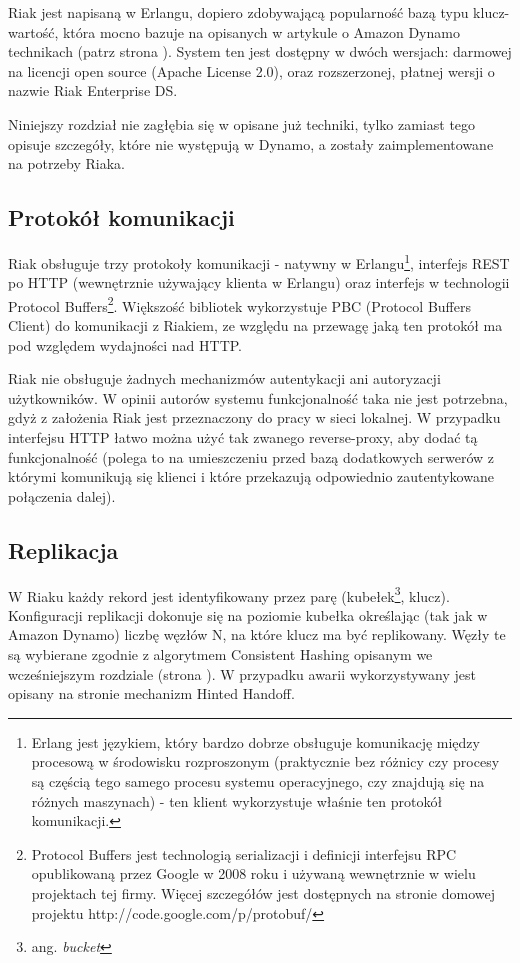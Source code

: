 Riak jest napisaną w Erlangu, dopiero zdobywającą popularność bazą typu klucz-wartość, która mocno bazuje na opisanych w artykule o Amazon Dynamo technikach (patrz strona \pageref{sec:dynamo-techniki}).
System ten jest dostępny w dwóch wersjach: darmowej na licencji open source (Apache License 2.0), oraz rozszerzonej, płatnej wersji o nazwie Riak Enterprise DS.

Niniejszy rozdział nie zagłębia się w opisane już techniki, tylko zamiast tego opisuje szczegóły, które nie występują w Dynamo, a zostały zaimplementowane na potrzeby Riaka.

\subsection*{Protokół komunikacji}

Riak obsługuje trzy protokoły komunikacji - natywny w Erlangu\footnote{Erlang jest językiem, który bardzo dobrze obsługuje komunikację między procesową w środowisku rozproszonym (praktycznie bez różnicy czy procesy są częścią tego samego procesu systemu operacyjnego, czy znajdują się na różnych maszynach) - ten klient wykorzystuje właśnie ten protokół komunikacji.}, interfejs REST po HTTP (wewnętrznie używający klienta w Erlangu) oraz interfejs w technologii Protocol Buffers\footnote{Protocol Buffers jest technologią serializacji i definicji interfejsu RPC opublikowaną przez Google w 2008 roku i używaną wewnętrznie w wielu projektach tej firmy. Więcej szczegółów jest dostępnych na stronie domowej projektu http://code.google.com/p/protobuf/}.
Większość bibliotek wykorzystuje PBC (Protocol Buffers Client) do komunikacji z Riakiem, ze względu na przewagę jaką ten protokół ma pod względem wydajności nad HTTP.

Riak nie obsługuje żadnych mechanizmów autentykacji ani autoryzacji użytkowników.
W opinii autorów systemu funkcjonalność taka nie jest potrzebna, gdyż z założenia Riak jest przeznaczony do pracy w sieci lokalnej.
W przypadku interfejsu HTTP łatwo można użyć tak zwanego reverse-proxy, aby dodać tą funkcjonalność (polega to na umieszczeniu przed bazą dodatkowych serwerów z którymi komunikują się klienci i które przekazują odpowiednio zautentykowane połączenia dalej).

\subsection*{Replikacja}

W Riaku każdy rekord jest identyfikowany przez parę (kubełek\footnote{ang. \emph{bucket}}, klucz).
Konfiguracji replikacji dokonuje się na poziomie kubełka określając (tak jak w Amazon Dynamo) liczbę węzłów N, na które klucz ma być replikowany.
Węzły te są wybierane zgodnie z algorytmem Consistent Hashing opisanym we wcześniejszym rozdziale (strona \pageref{sec:dynamo-consistent-hashing}).
W przypadku awarii wykorzystywany jest opisany na stronie \pageref{sec:dynamo-hinted-handoff} mechanizm Hinted Handoff.

